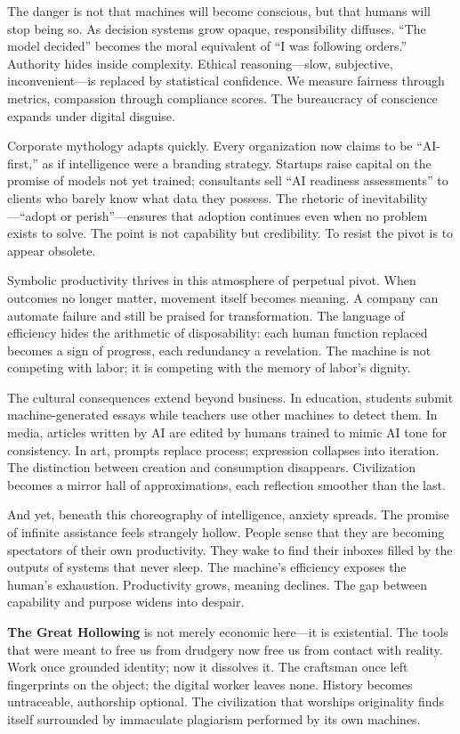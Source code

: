 \documentclass[11pt,twoside]{book}
\begin{document}
The danger is not that machines will become conscious, but that humans will stop being so.  As decision systems grow opaque, responsibility diffuses.  “The model decided” becomes the moral equivalent of “I was following orders.”  Authority hides inside complexity.  Ethical reasoning—slow, subjective, inconvenient—is replaced by statistical confidence.  We measure fairness through metrics, compassion through compliance scores.  The bureaucracy of conscience expands under digital disguise.

Corporate mythology adapts quickly.  Every organization now claims to be “AI-first,” as if intelligence were a branding strategy.  Startups raise capital on the promise of models not yet trained; consultants sell “AI readiness assessments” to clients who barely know what data they possess.  The rhetoric of inevitability—“adopt or perish”—ensures that adoption continues even when no problem exists to solve.  The point is not capability but credibility.  To resist the pivot is to appear obsolete.

Symbolic productivity thrives in this atmosphere of perpetual pivot.  When outcomes no longer matter, movement itself becomes meaning.  A company can automate failure and still be praised for transformation.  The language of efficiency hides the arithmetic of disposability: each human function replaced becomes a sign of progress, each redundancy a revelation.  The machine is not competing with labor; it is competing with the memory of labor’s dignity.

The cultural consequences extend beyond business.  In education, students submit machine-generated essays while teachers use other machines to detect them.  In media, articles written by AI are edited by humans trained to mimic AI tone for consistency.  In art, prompts replace process; expression collapses into iteration.  The distinction between creation and consumption disappears.  Civilization becomes a mirror hall of approximations, each reflection smoother than the last.

And yet, beneath this choreography of intelligence, anxiety spreads.  The promise of infinite assistance feels strangely hollow.  People sense that they are becoming spectators of their own productivity.  They wake to find their inboxes filled by the outputs of systems that never sleep.  The machine’s efficiency exposes the human’s exhaustion.  Productivity grows, meaning declines.  The gap between capability and purpose widens into despair.

\textbf{The Great Hollowing} is not merely economic here—it is existential.  The tools that were meant to free us from drudgery now free us from contact with reality.  Work once grounded identity; now it dissolves it.  The craftsman once left fingerprints on the object; the digital worker leaves none.  History becomes untraceable, authorship optional.  The civilization that worships originality finds itself surrounded by immaculate plagiarism performed by its own machines.
\end{document}
